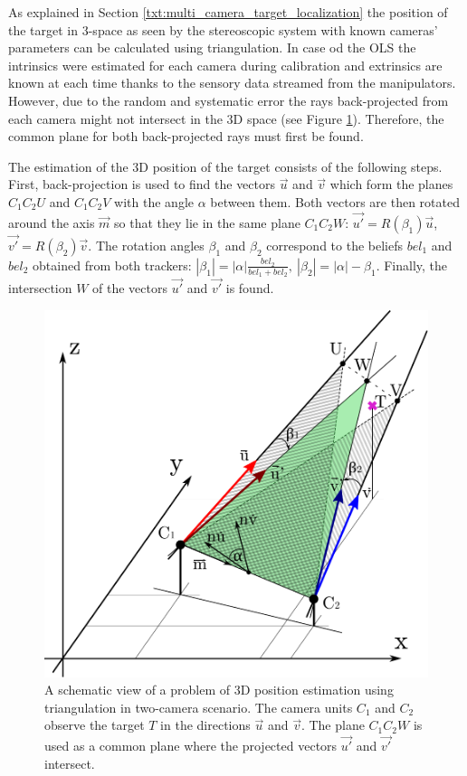 As explained in Section \ref{txt:multi_camera_target_localization} the position of the target in 3-space as seen by the stereoscopic system with known cameras' parameters can be calculated using triangulation. In case od the OLS the intrinsics were estimated for each camera during calibration and extrinsics are known at each time thanks to the sensory data streamed from the manipulators. However, due to the random and systematic error the rays back-projected from each camera might not intersect in the 3D space (see Figure \ref{fig:triangulationSchematicView}). Therefore, the common plane for both back-projected rays must first be found.

The estimation of the 3D position of the target consists of the following steps. First, back-projection is used to find the vectors $\vec{u}$ and $\vec{v}$ which form the planes $C_{1}C_{2}U$ and $C_{1}C_{2}V$ with the angle $\alpha$ between them. Both vectors are then rotated around the axis $\vec{m}$ so that they lie in the same plane $C_{1}C_{2}W$: $\vec{u'} = R(\beta_{1})\vec{u}$, $\vec{v'} = R(\beta_{2})\vec{v}$. The rotation angles $\beta_{1}$ and $\beta_{2}$ correspond to the beliefs $bel_{1}$ and $bel_{2}$ obtained from both trackers: $|\beta_{1}| = |\alpha|\frac{bel_{2}}{bel_{1} + bel_{2}},~|\beta_{2}| = |\alpha| -\beta_{1}$. Finally, the intersection $W$ of the vectors $\vec{u'}$ and $\vec{v'}$ is found.

\begin{figure}[htb]\centering
	\centering
	\includegraphics[width=0.45\linewidth]{fig/triangulation.pdf}
	\caption{A schematic view of a problem of 3D position estimation using triangulation in two-camera scenario. The camera units $C_{1}$ and $C_{2}$ observe the target $T$ in the directions $\vec{u}$ and $\vec{v}$. The plane $C_{1}C_{2}W$ is used as a common plane where the projected vectors $\vec{u'}$ and $\vec{v'}$ intersect.}
	\label{fig:triangulationSchematicView}
\end{figure}

